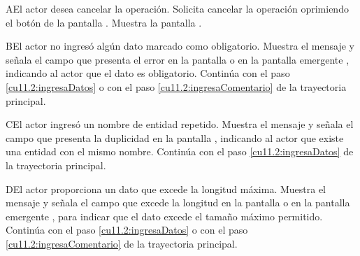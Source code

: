  \begin{UCtrayectoriaA}{A}{El actor desea cancelar la operación.}
    \UCpaso[\UCactor] Solicita cancelar la operación oprimiendo el botón  de la pantalla .
    \UCpaso[\UCsist] Muestra la pantalla .
 \end{UCtrayectoriaA}
 \begin{UCtrayectoriaA}{B}{El actor no ingresó algún dato marcado como obligatorio.}
    \UCpaso[\UCsist] Muestra el mensaje  y señala el campo que presenta el error en la pantalla 
	     o en la pantalla emergente , indicando al actor que el dato es obligatorio.
    \UCpaso[] Continúa con el paso \ref{cu11.2:ingresaDatos} o con el paso \ref{cu11.2:ingresaComentario} de la trayectoria principal.
 \end{UCtrayectoriaA}
 \begin{UCtrayectoriaA}{C}{El actor ingresó un nombre de entidad repetido.}
    \UCpaso[\UCsist] Muestra el mensaje  y señala el campo que presenta la duplicidad en la pantalla 
	    , indicando al actor que existe una entidad con el mismo nombre.
    \UCpaso[] Continúa con el paso \ref{cu11.2:ingresaDatos} de la trayectoria principal.
 \end{UCtrayectoriaA}
 \begin{UCtrayectoriaA}{D}{El actor proporciona un dato que excede la longitud máxima.}
    \UCpaso[\UCsist] Muestra el mensaje  y señala el campo que excede la 
    longitud en la pantalla  o en la pantalla emergente , para indicar que el dato excede el tamaño máximo permitido.
    \UCpaso[] Continúa con el paso \ref{cu11.2:ingresaDatos} o con el paso \ref{cu11.2:ingresaComentario} de la trayectoria principal.
 \end{UCtrayectoriaA}
